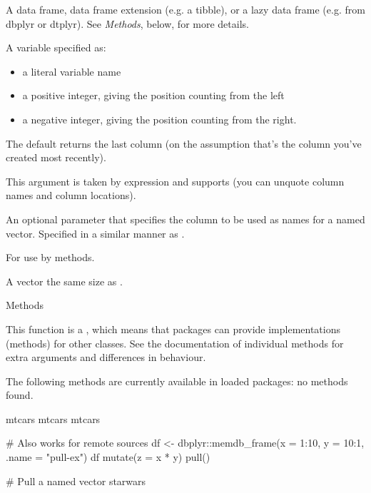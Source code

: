 \documentclass[a4paper]{book}
\begin{document}
\begin{Arguments}
\begin{ldescription}
\item[\code{.data}] A data frame, data frame extension (e.g. a tibble), or a
lazy data frame (e.g. from dbplyr or dtplyr). See \emph{Methods}, below, for
more details.

\item[\code{var}] A variable specified as:
\begin{itemize}

\item{} a literal variable name
\item{} a positive integer, giving the position counting from the left
\item{} a negative integer, giving the position counting from the right.

\end{itemize}


The default returns the last column (on the assumption that's the
column you've created most recently).

This argument is taken by expression and supports
 (you can unquote column
names and column locations).

\item[\code{name}] An optional parameter that specifies the column to be used
as names for a named vector. Specified in a similar manner as .

\item[\code{...}] For use by methods.
\end{ldescription}
\end{Arguments}
%
\begin{Value}
A vector the same size as .
\end{Value}
%
\begin{Section}{Methods}

This function is a , which means that packages can provide
implementations (methods) for other classes. See the documentation of
individual methods for extra arguments and differences in behaviour.

The following methods are currently available in loaded packages:
no methods found.
\end{Section}
%
\begin{Examples}
\begin{ExampleCode}
mtcars %
mtcars %
mtcars %


# Also works for remote sources
df <- dbplyr::memdb_frame(x = 1:10, y = 10:1, .name = "pull-ex")
df %
  mutate(z = x * y) %
  pull()


# Pull a named vector
starwars %
\end{ExampleCode}
\end{Examples}
\end{document}
